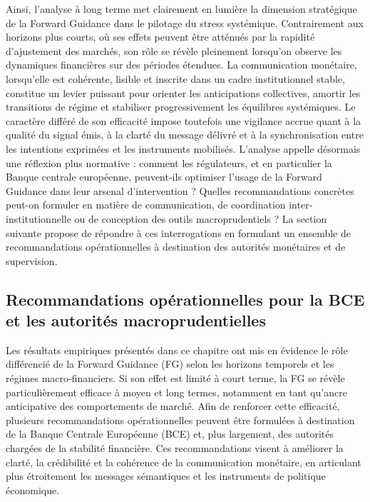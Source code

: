 Ainsi, l’analyse à long terme met clairement en lumière la dimension stratégique de la Forward Guidance dans le pilotage du stress systémique. Contrairement aux horizons plus courts, où ses effets peuvent être atténués par la rapidité d’ajustement des marchés, son rôle se révèle pleinement lorsqu’on observe les dynamiques financières sur des périodes étendues. La communication monétaire, lorsqu’elle est cohérente, lisible et inscrite dans un cadre institutionnel stable, constitue un levier puissant pour orienter les anticipations collectives, amortir les transitions de régime et stabiliser progressivement les équilibres systémiques. Le caractère différé de son efficacité impose toutefois une vigilance accrue quant à la qualité du signal émis, à la clarté du message délivré et à la synchronisation entre les intentions exprimées et les instruments mobilisés. L’analyse appelle désormais une réflexion plus normative : comment les régulateurs, et en particulier la Banque centrale européenne, peuvent-ils optimiser l’usage de la Forward Guidance dans leur arsenal d’intervention ? Quelles recommandations concrètes peut-on formuler en matière de communication, de coordination inter-institutionnelle ou de conception des outils macroprudentiels ? La section suivante propose de répondre à ces interrogations en formulant un ensemble de recommandations opérationnelles à destination des autorités monétaires et de supervision.

\subsection{Recommandations opérationnelles pour la BCE et les autorités macroprudentielles}

Les résultats empiriques présentés dans ce chapitre ont mis en évidence le rôle différencié de la Forward Guidance (FG) selon les horizons temporels et les régimes macro-financiers. Si son effet est limité à court terme, la FG se révèle particulièrement efficace à moyen et long termes, notamment en tant qu’ancre anticipative des comportements de marché. Afin de renforcer cette efficacité, plusieurs recommandations opérationnelles peuvent être formulées à destination de la Banque Centrale Européenne (BCE) et, plus largement, des autorités chargées de la stabilité financière. Ces recommandations visent à améliorer la clarté, la crédibilité et la cohérence de la communication monétaire, en articulant plus étroitement les messages sémantiques et les instruments de politique économique.

